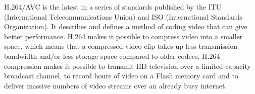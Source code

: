 \documentclass[../main.tex]{subfiles}
\begin{document}
H.264/AVC is the latest in a series of standards published by the ITU (International Telecommunications Union) and ISO (International Standards Organization). It describes and defines a method of coding video that can give better performance. H.264 makes it possible to compress video into a smaller space, which means that a compressed video clip takes up less transmission bandwidth and/or less storage space compared to older codecs. H.264 compression makes it possible to transmit HD television over a limited-capacity broadcast channel, to record hours of video on a Flash memory card and to deliver massive numbers of video streams over an already busy internet.
\end{document}

